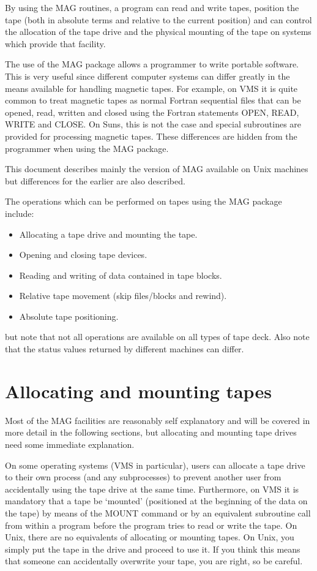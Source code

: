 By using the MAG routines, a program can read and write tapes, position the
tape (both in absolute terms and relative to the current position) and can
control the allocation of the tape drive and the physical mounting of the tape
on systems which provide that facility.

The use of the MAG package allows a programmer to write portable software. This
is very useful since different computer systems can differ greatly in the means
available for handling magnetic tapes. For example, on VMS it is quite common
to treat magnetic tapes as normal Fortran sequential files that can be opened,
read, written and closed using the Fortran statements OPEN, READ, WRITE and
CLOSE. On Suns, this is not the case and special subroutines are provided for
processing magnetic tapes. These differences are hidden from the programmer
when using the MAG package.

This document describes mainly the version of MAG available on Unix machines
but differences for the earlier 
are also described.

The operations which can be performed on tapes using the MAG package
include:

\begin{itemize}
\item Allocating a tape drive and mounting the tape.
\item Opening and closing tape devices.
\item Reading and writing of data contained in tape blocks.
\item Relative tape movement (skip files/blocks and rewind).
\item Absolute tape positioning.
\end{itemize}

but note that not all operations are available on all types of tape deck.
Also note that the status values returned by different machines can differ.

\section{Allocating and mounting tapes}
Most of the MAG facilities are reasonably self explanatory and will be covered 
in more detail in the following sections, but allocating and mounting tape 
drives need some immediate explanation.

On some operating systems (VMS in particular), users can allocate a tape drive
to their own process (and any subprocesses) to prevent another user from
accidentally using the tape drive at the same time. Furthermore, on VMS it is
mandatory that a tape be `mounted' (positioned at the beginning of the data on
the tape) by means of the MOUNT command or by an equivalent subroutine call
from within a program before the program tries to read or write the tape. On
Unix, there are no equivalents of allocating or mounting tapes. On Unix, you
simply put the tape in the drive and proceed to use it. If you think this means
that someone can accidentally overwrite your tape, you are right, so be
careful.

